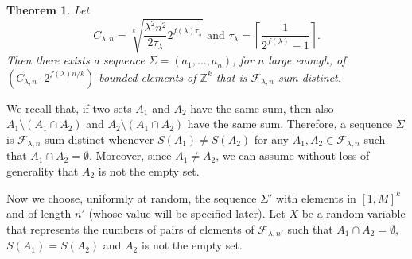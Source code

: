 \documentclass[a4paper]{amsart}
\theoremstyle{plain}
\newtheorem{Theorem}[Definition]{Theorem}
\begin{document}
\begin{Theorem}\label{PUB2}
Let
$$
C_{\lambda, n} = \sqrt[k]{\frac{\lambda^2 n^2}{2 \tau_{\lambda}} 2^{f(\lambda) \tau_{\lambda}}} \text{ and } \tau_{\lambda} = \left \lceil \frac{1}{2^{f(\lambda)}-1} \right \rceil.
$$
Then there exists a sequence $\Sigma=(a_1,\dots,a_n)$, for $n$ large enough,  of $\left( C_{\lambda, n} \cdot 2^{f(\lambda) n/k}\right)$-bounded elements of $\mathbb{Z}^k$ that is $\mathcal{F}_{\lambda,n}$-sum distinct.
\end{Theorem}
\proof
We recall that, if two sets $A_1$ and $A_2$ have the same sum, then also $A_1\setminus (A_1\cap A_2)$ and $A_2\setminus (A_1\cap A_2)$ have the same sum.
Therefore, a sequence $\Sigma$ is $\mathcal{F}_{\lambda,n}$-sum distinct whenever $S(A_1)\not=S(A_2)$ for any $A_1,A_2\in\mathcal{F}_{\lambda,n}$ such that $A_1\cap A_2=\emptyset$. Moreover, since $A_1\not=A_2$, we can assume without loss of generality that $A_2$ is not the empty set.

Now we choose, uniformly at random, the sequence $\Sigma'$ with elements in $[1, M]^k$ and of length $n'$ (whose value will be specified later).  Let $X$ be a random variable that represents the numbers of pairs of elements of $\mathcal{F}_{\lambda,n'}$ such that $A_1\cap A_2=\emptyset$, $S(A_1)=S(A_2)$ and $A_2$ is not the empty set.
\end{document}

